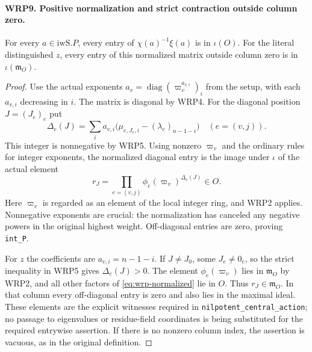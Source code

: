 \documentclass[11pt,a4paper]{article}
\numberwithin{equation}{section}
\theoremstyle{remark}\newtheorem{remark}[theorem]{Remark}
\begin{document}
\paragraph{WRP9. Positive normalization and strict contraction outside column zero.}
\label{claim:WRP9}
For every $a\in\mathrm{iwS}.P$, every entry of
$\chi(a)^{-1}\xi(a)$ is in $\iota(O)$.  For the literal
distinguished $z$, every entry of this normalized matrix
outside column zero is in $\iota(\mathfrak m_O)$.
\begin{proof}
Use the actual exponents
$a_v=\operatorname{diag}(\varpi_v^{a_{v,\allowbreak{} i}})_i$ from
the setup, with each $a_{v,\allowbreak{} i}$ decreasing in $i$.
The matrix is diagonal by WRP4.  For the diagonal position
$J=(J_e)_e$ put
\[
 \Delta_e(J)=\sum_i a_{v,\allowbreak{} i}
                \bigl(\mu_{e,\allowbreak{} J_e,\allowbreak{} i}-(\lambda_e)_{n-1-i}\bigr)
                \quad(e=(v,\allowbreak{} j)).
\]
This integer is nonnegative by WRP5.  Using nonzero
$\varpi_v$ and the ordinary rules for integer exponents,
the normalized diagonal entry is the image under $\iota$
of the actual element
\begin{equation}\label{eq:wrp-normalized}
          r_J=\prod_{e=(v,\allowbreak{} j)}\phi_e(\varpi_v)^{\Delta_e(J)}
                                                        \in O.
\end{equation}
Here $\varpi_v$ is regarded as an element of the local
integer ring, and WRP2 applies.  Nonnegative exponents
are crucial: the normalization has canceled any negative
powers in the original highest weight.  Off-diagonal
entries are zero, proving \texttt{int\_\allowbreak P}.

For $z$ the coefficients are $a_{v,\allowbreak{} i}=n-1-i$.
If $J\ne J_0$, some $J_e\ne0_e$, so the strict inequality
in WRP5 gives $\Delta_e(J)>0$.  The element
$\phi_e(\varpi_v)$ lies in $\mathfrak m_O$ by WRP2,
and all other factors of \eqref{eq:wrp-normalized} lie
in $O$.  Thus $r_J\in\mathfrak m_O$.  In that column
every off-diagonal entry is zero and also lies in the
maximal ideal.  These elements are the explicit witnesses
required in \texttt{nilpotent\_\allowbreak central\_\allowbreak action}; no
passage to eigenvalues or residue-field coordinates is
being substituted for the required entrywise assertion.
If there is no nonzero column index, the assertion is
vacuous, as in the original definition.
\end{proof}

\end{document}

